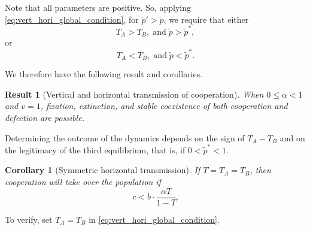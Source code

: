 \documentclass[12pt]{extarticle}
\newtheorem{corollary}{Corollary}
\newtheorem{result}{Result}
\begin{document}
Note that all parameters are positive.
So, applying \autoref{eq:vert_hori_global_condition}, for $\tilde{p}'>\tilde{p}$,  we require that either 
\begin{equation} \label{eq:vert_hori_global_condition1}
T_A>T_B, \;\text{and}\; \tilde{p}>\tilde{p}^*,
\end{equation} or 
\begin{equation} \label{eq:vert_hori_global_condition2}
T_A<T_B, \;\text{and}\; \tilde{p}<\tilde{p}^* .
\end{equation}


We therefore have the following result and corollaries.\\

\begin{result}[Vertical and horizontal transmission of cooperation]
When $0 \le \alpha<1$ and $v=1$, fixation, extinction, and stable coexistence of both cooperation and defection are possible.
\end{result}

Determining the outcome of the dynamics depends on the sign of $T_A-T_B$ and on the legitimacy of the third equilibrium, that is, if $0<\tilde{p}^*<1$.
\\

%
%

\begin{corollary}[Symmetric horizontal transmission]
If $T=T_A=T_B$, then cooperation will take over the population if
\begin{equation}
\label{eq:equal_transmission}
c < b \cdot \frac{\alpha T}{1-T}.
\end{equation}
\end{corollary}
To verify, set $T_A=T_B$ in \autoref{eq:vert_hori_global_condition}.
\end{document}
